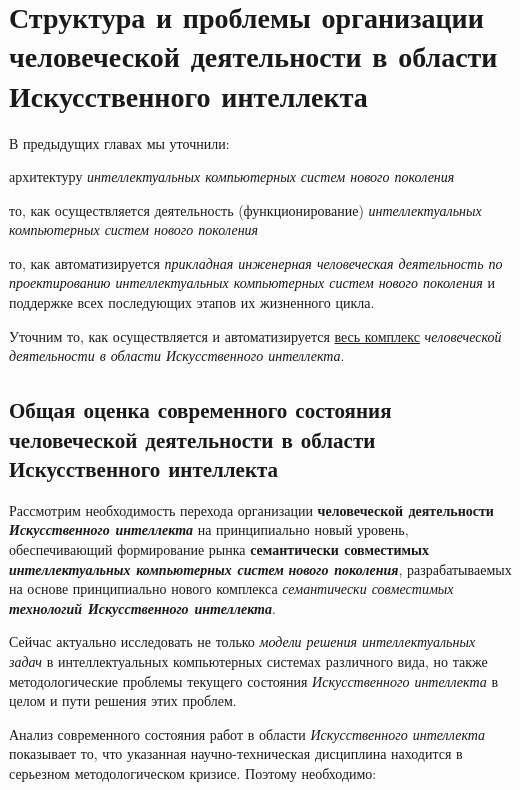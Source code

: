 \section{Структура и проблемы организации человеческой деятельности в области Искусственного интеллекта}
\label{sec_activity_ai}

В предыдущих главах мы уточнили:

\begin{textitemize}
	\item
	архитектуру \textit{интеллектуальных компьютерных систем нового поколения}
	\item
	то, как осуществляется деятельность (функционирование) \textit{интеллектуальных компьютерных систем нового поколения}
	\item
	то, как автоматизируется \textit{прикладная инженерная человеческая деятельность по проектированию интеллектуальных компьютерных систем нового поколения} и поддержке всех последующих этапов их жизненного цикла.
\end{textitemize}

Уточним то, как осуществляется и автоматизируется \underline{весь комплекс} \textit{человеческой деятельности в области Искусственного интеллекта}.

\subsection{Общая оценка современного состояния человеческой деятельности в области Искусственного интеллекта}

Рассмотрим необходимость перехода организации \textbf{человеческой деятельности} \textbf{\textit{Искусственного интеллекта}} на принципиально новый уровень, обеспечивающий формирование рынка \textbf{семантически совместимых} \textbf{\textit{интеллектуальных компьютерных систем}} \textbf{\textit{нового поколения}}, разрабатываемых на основе принципиально нового комплекса \textit{семантически совместимых} \textbf{\textit{технологий Искусственного интеллекта}}.

Сейчас актуально исследовать не только \textit{модели решения интеллектуальных задач} в интеллектуальных компьютерных системах различного вида, но также методологические проблемы текущего состояния \textit{Искусственного интеллекта} в целом и пути решения этих проблем.

Анализ современного состояния работ в области \textit{Искусственного интеллекта} показывает то, что указанная научно-техническая дисциплина находится в серьезном методологическом кризисе. Поэтому необходимо:

